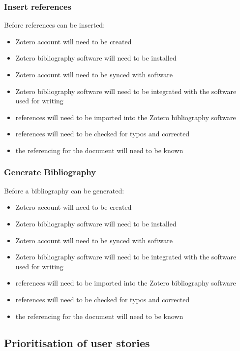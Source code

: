 \documentclass{article}
\begin{document}
\subsubsection*{Insert references}

Before references can be inserted:
\begin{itemize}
\item Zotero account will need to be created
    \item Zotero bibliography software will need to be installed
    \item Zotero account will need to be synced with software
    \item Zotero bibliography software will need to be integrated with the software used for writing
    \item references will need to be imported into the Zotero bibliography software
    \item references will need to be checked for typos and corrected
    \item the referencing for the document will need to be known
\end{itemize}

\subsubsection*{Generate Bibliography}

Before a bibliography can be generated:
\begin{itemize}
\item Zotero account will need to be created
    \item Zotero bibliography software will need to be installed
    \item Zotero account will need to be synced with software
    \item Zotero bibliography software will need to be integrated with the software used for writing
    \item references will need to be imported into the Zotero bibliography software
    \item references will need to be checked for typos and corrected
    \item the referencing for the document will need to be known
\end{itemize}

\subsection*{Prioritisation of user stories}
\end{document}
